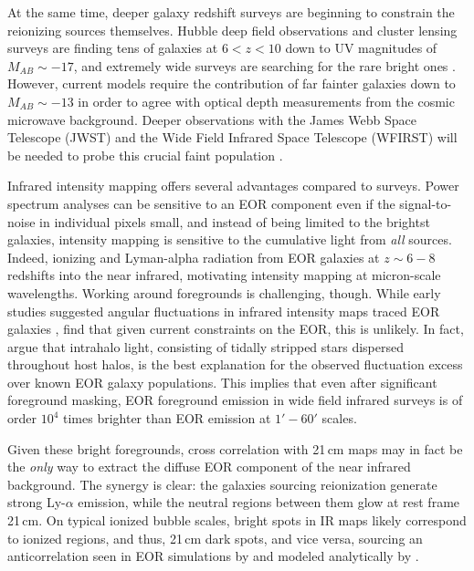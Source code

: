 \documentclass{emulateapj}
\begin{document}
At the same time, deeper galaxy redshift surveys are beginning to constrain the reionizing sources themselves. Hubble deep field observations \citep{Bouwens2011,Illingworth2013,Dunlop2013} and cluster lensing surveys are finding tens of galaxies at $6<z<10$ down to UV magnitudes of $M_{AB}\sim-17$, and extremely wide surveys are searching for the rare bright ones \citep{Schmidt2014,Trenti2011,Bradley2012}. However, current models require the contribution of far fainter galaxies down to $M_{AB}\sim-13$ \citep{Robertson2013,Alvarez2012} in order to agree with optical depth measurements \citep{planck16} from the cosmic microwave background. Deeper observations with the James Webb Space Telescope (JWST) \citep{Gardner2006} and the Wide Field Infrared Space Telescope (WFIRST) \citep{Spergel2013} will be needed to probe this crucial faint population \citep{Atek2015}.

Infrared intensity mapping offers several advantages compared to surveys. Power spectrum analyses can be sensitive to an EOR component even if the signal-to-noise in individual pixels small, and instead of being limited to the brightst galaxies, intensity mapping is sensitive to the cumulative light from \textit{all} sources. Indeed,  ionizing and Lyman-alpha radiation from EOR galaxies at $z\sim6-8$ redshifts into the near infrared, motivating intensity mapping at micron-scale wavelengths. Working around foregrounds is challenging, though. While early studies suggested angular fluctuations in infrared intensity maps traced EOR galaxies \citep[e.g.,][]{kash1,kash2,kash3}, \citet{kash4} find that given current constraints on the EOR, this is unlikely. In fact, \citet{cooray12,zemcov14} argue that intrahalo light, consisting of tidally stripped stars dispersed throughout host halos, is the best explanation for the observed fluctuation excess over known EOR galaxy populations. This implies that even after significant foreground masking, EOR foreground emission in wide field infrared surveys is of order $10^4$ times brighter than EOR emission at $1'-60'$ scales.

Given these bright foregrounds, cross correlation with 21\,cm maps may in fact be the \textit{only} way to extract the diffuse EOR component of the near infrared background. The synergy is clear: the galaxies sourcing reionization generate strong Ly-$\alpha$ emission, while the neutral regions between them glow at rest frame 21\,cm. On typical ionized bubble scales, bright spots in IR maps likely correspond to ionized regions, and thus, 21\,cm dark spots, and vice versa, sourcing an anticorrelation seen in EOR simulations by \citet{silva12,Heneka2016} and modeled analytically by \citet{feng17}. 
\end{document}
